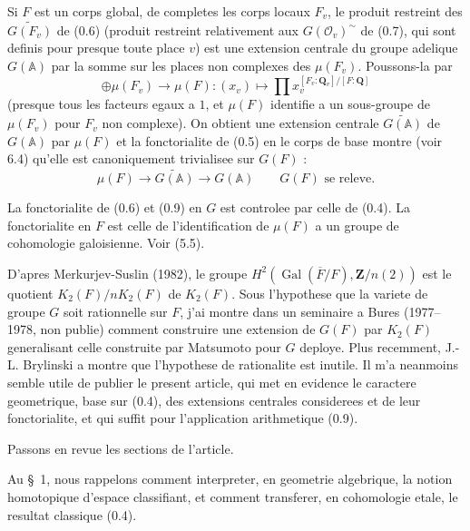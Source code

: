 \documentclass[11pt,a4paper]{article}
\theoremstyle{plain}
\theoremstyle{definition}
\DeclareMathOperator{\Gal}{Gal}
\begin{document}
Si $F$ est un corps global, de completes les corps locaux $F_v$, le produit restreint des $\widetilde{G(F_v)}$ de (0.6) (produit restreint relativement aux $G(\mathcal{O}_v)^{\sim}$ de (0.7), qui sont definis pour presque toute place $v$) est une extension centrale du groupe adelique $G(\mathbb{A})$ par la somme sur les places non complexes des $\mu(F_v)$. Poussons-la par
\begin{equation}\label{0.8}
\oplus \mu(F_v) \to \mu(F) : (x_v) \mapsto \prod x_v^{[F_v:\mathbf{Q}_v]/[F:\mathbf{Q}]}
\end{equation}
(presque tous les facteurs egaux a $1$, et $\mu(F)$ identifie a un sous-groupe de $\mu(F_v)$ pour $F_v$ non complexe). On obtient une extension centrale $\widetilde{G(\mathbb{A})}$ de $G(\mathbb{A})$ par $\mu(F)$ et la fonctorialite de (0.5) en le corps de base montre (voir 6.4) qu'elle est canoniquement trivialisee sur $G(F)$ :
\begin{equation}\label{0.9}
\mu(F) \to \widetilde{G(\mathbb{A})} \to G(\mathbb{A}) \qquad G(F) \text{ se releve.}
\end{equation}

La fonctorialite de (0.6) et (0.9) en $G$ est controlee par celle de (0.4). La fonctorialite en $F$ est celle de l'identification de $\mu(F)$ a un groupe de cohomologie galoisienne. Voir (5.5).

D'apres Merkurjev-Suslin (1982), le groupe $H^2(\Gal(\overline{F}/F), \mathbf{Z}/n(2))$ est le quotient $K_2(F)/nK_2(F)$ de $K_2(F)$. Sous l'hypothese que la variete de groupe $G$ soit rationnelle sur $F$, j'ai montre dans un seminaire a Bures (1977--1978, non publie) comment construire une extension de $G(F)$ par $K_2(F)$ generalisant celle construite par Matsumoto pour $G$ deploye. Plus recemment, J.-L. Brylinski a montre que l'hypothese de rationalite est inutile. Il m'a neanmoins semble utile de publier le present article, qui met en evidence le caractere geometrique, base sur (0.4), des extensions centrales considerees et de leur fonctorialite, et qui suffit pour l'application arithmetique (0.9).

Passons en revue les sections de l'article.

Au \S~1, nous rappelons comment interpreter, en geometrie algebrique, la notion homotopique d'espace classifiant, et comment transferer, en cohomologie etale, le resultat classique (0.4).
\end{document}
